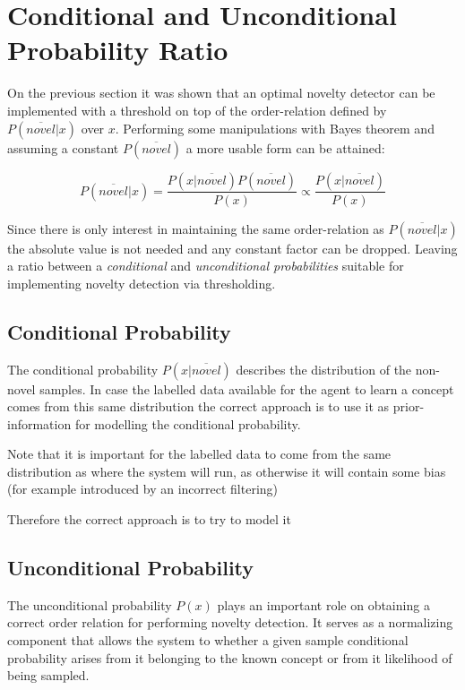 \section{Conditional and Unconditional Probability Ratio}

On the previous section it was shown that an optimal novelty detector can be
implemented with a threshold on top of the order-relation defined by
$P(\overline{novel}|x)$ over $x$. Performing some manipulations with
Bayes theorem and assuming a constant $P(\overline{novel})$ a more usable
form can be attained:

\begin{equation}
\label{eq:novelty-ratio}
          P(\overline{novel}|x)
  =       \frac{P(x|\overline{novel}) P(\overline{novel})}{P(x)}
  \propto \frac{P(x|\overline{novel})}{P(x)}
\end{equation}

Since there is only interest in maintaining the same order-relation as
$P(\overline{novel}|x)$ the absolute value is not needed and any constant
factor can be dropped. Leaving a ratio between a \emph{conditional} and
\emph{unconditional probabilities} suitable for implementing novelty detection
via  thresholding.



\subsection{Conditional Probability}
The conditional probability $P(x|\overline{novel})$ describes the distribution
of the non-novel samples. In case the labelled data available for the agent
to learn a concept comes from this same distribution the correct approach
is to use it as prior-information for modelling the conditional probability.

Note that it is important for the labelled data to come from the same
distribution as where the system will run, as otherwise it will contain some
bias (for example introduced by an incorrect filtering)

Therefore the correct approach is to try to model it 


\subsection{Unconditional Probability}
The unconditional probability $P(x)$ plays an important role on obtaining a
correct order relation for performing novelty detection.
It serves as a normalizing component that allows the system to  whether
a given sample conditional probability arises from it belonging to the
known concept or from it likelihood of being sampled.


